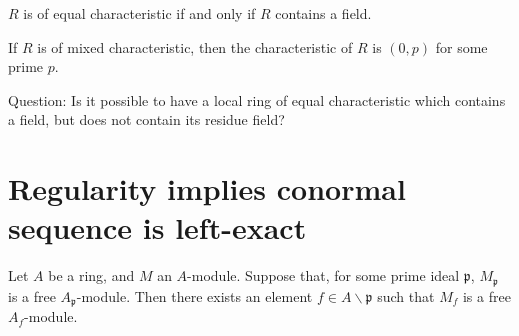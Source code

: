 \begin{lem}
	\(R\) is of equal characteristic if and only if 
	\(R\) contains a field.
\end{lem}

\begin{lem}
	If \(R\) is of mixed characteristic, then the characteristic
	of \(R\) is \((0,p)\) for some prime \(p\).
\end{lem}

Question: Is it possible to have a local ring 
of equal characteristic which 
contains a field, but does not contain its residue field?



\section{Regularity implies conormal sequence is left-exact}

%
%

\begin{lem}
	Let \(A\) be a ring, and \(M\) an \(A\)-module.
	Suppose that, for some prime ideal \(\mathfrak{p}\),
	\(M_{\mathfrak{p}}\) is a free
	\(A_{\mathfrak{p}}\)-module.
	Then there exists an element 
	\(f \in A \smallsetminus \mathfrak{p}\)
	such that 
	\(M_{f}\) is a free \(A_{f}\)-module.
\end{lem}

